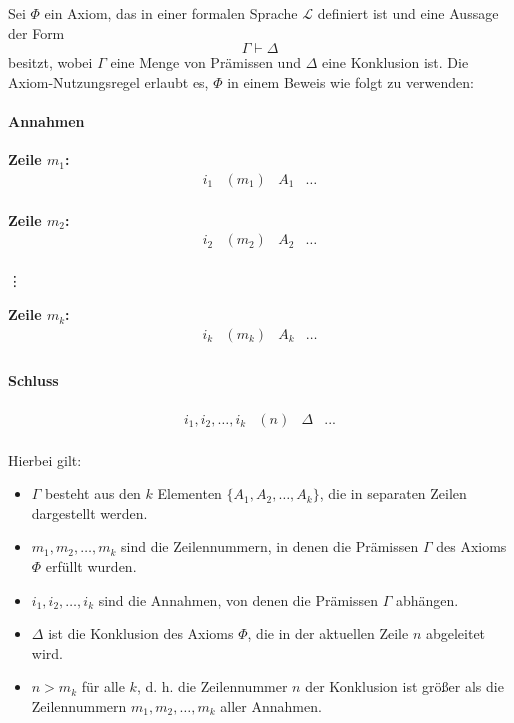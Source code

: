\documentclass[main.tex]{subfiles}
\begin{document}
\begin{definition}
\label{dfSigmaGenImplicitRule}
Sei \(\Phi\) ein Axiom, das in einer formalen Sprache \(\mathcal{L}\) definiert ist und eine Aussage der Form 
\[
\Gamma \vdash \Delta
\]
besitzt, wobei \(\Gamma\) eine Menge von Prämissen und \(\Delta\) eine Konklusion ist. Die Axiom-Nutzungsregel erlaubt es, \(\Phi\) in einem Beweis wie folgt zu verwenden:

\paragraph{Annahmen}
\textbf{Zeile \(m_1\):}
\[
\begin{array}{llll}
   i_1& (m_1) & A_1 & \dots \\
\end{array}
\]

\textbf{Zeile \(m_2\):}
\[
\begin{array}{llll}
   i_2& (m_2) & A_2 & \dots \\
\end{array}
\]

\vdots

\textbf{Zeile \(m_k\):}
\[
\begin{array}{llll}
   i_k& (m_k) & A_k & \dots \\
\end{array}
\]

\paragraph{Schluss}
\[
\begin{array}{llll}
   i_1, i_2, \ldots, i_k & (n) & \Delta & ... \\
\end{array}
\]

Hierbei gilt:
\begin{itemize}
    \item \( \Gamma \) besteht aus den \( k \) Elementen \( \{A_1, A_2, \ldots, A_k\} \), die in separaten Zeilen dargestellt werden.
    \item \( m_1, m_2, \ldots, m_k \) sind die Zeilennummern, in denen die Prämissen \( \Gamma \) des Axioms \(\Phi\) erfüllt wurden.
    \item \( i_1, i_2, \ldots, i_k \) sind die Annahmen, von denen die Prämissen \( \Gamma \) abhängen.
    \item \( \Delta \) ist die Konklusion des Axioms \(\Phi\), die in der aktuellen Zeile \( n \) abgeleitet wird.
    \item \( n > m_k \) für alle \( k \), d. h. die Zeilennummer \( n \) der Konklusion ist größer als die Zeilennummern \( m_1, m_2, \ldots, m_k \) aller Annahmen.
\end{itemize}
\end{definition}
\end{document}
